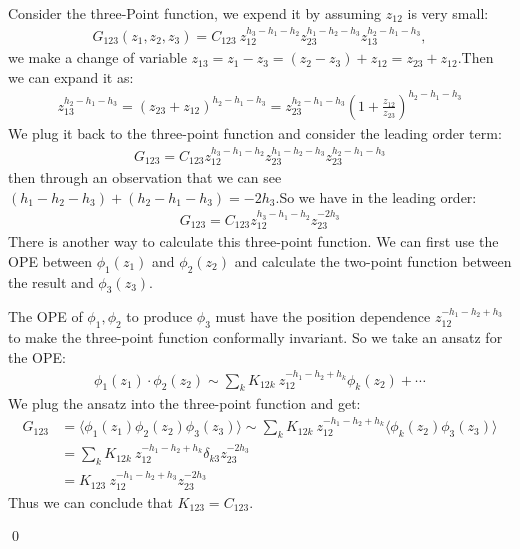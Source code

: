 Consider the three-Point function, we expend it by assuming $ z_{12} $ is very small:
\begin{align}
  G_{123}(z_1,z_2,z_3)=C_{123}\ z_{12}^{h_3-h_1-h_2}z_{23}^{h_1-h_2-h_3}z_{13}^{h_2-h_1-h_3},
\end{align}
we make a change of variable $ z_{13}=z_1-z_3=(z_2-z_3)+z_{12}=z_{23}+z_{12}. $Then we can expand it as:
\begin{align}
  z_{13}^{h_2-h_1-h_3}=(z_{23}+z_{12})^{h_2-h_1-h_3}=z_{23}^{h_2-h_1-h_3}\left(1+\frac{z_{12}}{z_{23}}\right)^{h_2-h_1-h_3}
\end{align}
We plug it back to the three-point function and consider the leading order term:
\begin{align}
  G_{123}=C_{123}z_{12}^{h_3-h_1-h_2}z_{23}^{h_1-h_2-h_3}z_{23}^{h_2-h_1-h_3}
\end{align}
then through an observation that we can see $ (h_1-h_2-h_3)+(h_2-h_1-h_3)=-2h_3. $So we have in the leading order:
\begin{align}
  G_{123}=C_{123}\left.z_{12}^{h_3-h_1-h_2}\right.z_{23}^{-2h_3} 
\end{align}
There is another way to calculate this three-point function. We can first use the OPE between $ \phi_1(z_1) $ and $ \phi_2(z_2) $ and calculate the two-point function between the result and $ \phi_3(z_3) $. 

The OPE of $ \phi_1, \phi_2 $ to produce $ \phi_3 $ must have the position dependence $ z_{12}^{-h_1-h_2+h_3} $ to make the three-point function conformally invariant. So we take an ansatz for the OPE:
\begin{align}
  \phi_1(z_1)\cdot\phi_2(z_2)\sim\sum_k K_{12k}\ z_{12}^{-h_1-h_2+h_k}\phi_k(z_2)+\cdots
\end{align}
We plug the ansatz into the three-point function and get:
\begin{align}
  G_{123}&=\langle\phi_1(z_1)\phi_2(z_2)\phi_3(z_3)\rangle\sim\sum_k K_{12k}\ z_{12}^{-h_1-h_2+h_k}\langle\phi_k(z_2)\phi_3(z_3)\rangle\\ 
         &=\sum_k K_{12k}\ z_{12}^{-h_1-h_2+h_k} \delta_{k3}z_{23}^{-2h_3}\\ 
         &= K_{123}\ z_{12}^{-h_1-h_2+h_3} z_{23}^{-2h_3}
\end{align}
Thus we can conclude that $ K_{123}=C_{123} $. 

\qed 


